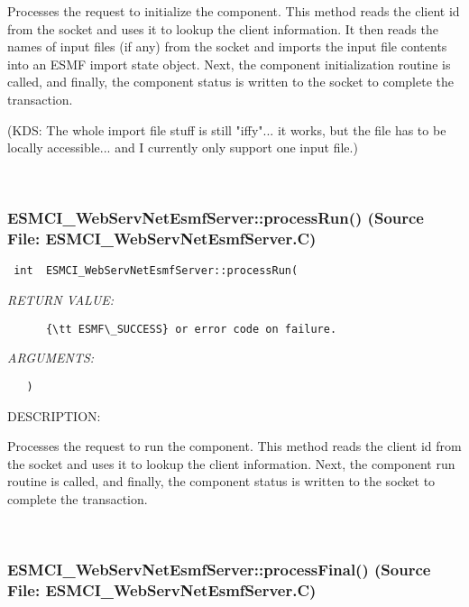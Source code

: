       Processes the request to initialize the component.  This method reads the
      client id from the socket and uses it to lookup the client information.
      It then reads the names of input files (if any) from the socket and
      imports the input file contents into an ESMF import state object.
      Next, the component initialization routine is called, and finally, the
      component status is written to the socket to complete the transaction.
  
      (KDS: The whole import file stuff is still "iffy"... it works, but the
            file has to be locally accessible... and I currently only support
            one input file.)
   
 
\mbox{}\hrulefill\
 
\subsubsection{ESMCI\_WebServNetEsmfServer::processRun() (Source File: ESMCI\_WebServNetEsmfServer.C)}


  
\begin{verbatim} int  ESMCI_WebServNetEsmfServer::processRun(\end{verbatim}{\em RETURN VALUE:}
\begin{verbatim}      {\tt ESMF\_SUCCESS} or error code on failure.\end{verbatim}{\em ARGUMENTS:}
\begin{verbatim}   )\end{verbatim}
{\sf DESCRIPTION:\\ }


      Processes the request to run the component.  This method reads the
      client id from the socket and uses it to lookup the client information.
      Next, the component run routine is called, and finally, the
      component status is written to the socket to complete the transaction.
   
 
\mbox{}\hrulefill\
 
\subsubsection{ESMCI\_WebServNetEsmfServer::processFinal() (Source File: ESMCI\_WebServNetEsmfServer.C)}


